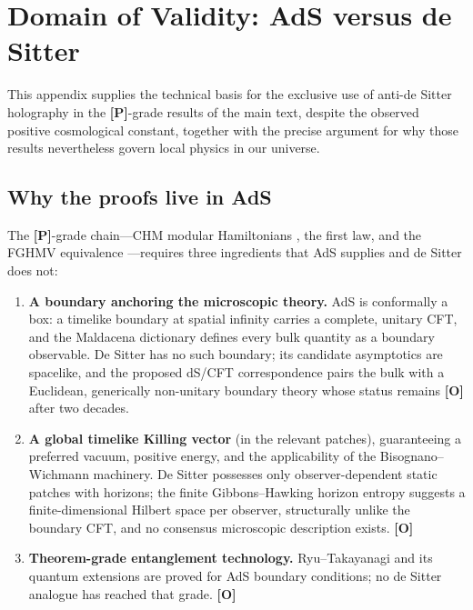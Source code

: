 \documentclass[11pt]{article}
\theoremstyle{definition}
\newcommand{\pP}{\textbf{[P]}}
\newcommand{\pO}{\textbf{[O]}}
\begin{document}
\appendix

\section{Domain of Validity: AdS versus de Sitter}
\label{app:adsds}

This appendix supplies the technical basis for the exclusive use of
anti-de Sitter holography in the \pP{}-grade results of the main text,
despite the observed positive cosmological constant, together with the
precise argument for why those results nevertheless govern local physics
in our universe.

\subsection{Why the proofs live in AdS}

The \pP{}-grade chain---CHM modular Hamiltonians \cite{CHM2011}, the first
law, and the FGHMV equivalence \cite{Faulkner2014,Lashkari2014}---requires
three ingredients that AdS supplies and de Sitter does not:

\begin{enumerate}[itemsep=2pt]
\item \textbf{A boundary anchoring the microscopic theory.} AdS is
conformally a box: a timelike boundary at spatial infinity carries a
complete, unitary CFT, and the Maldacena dictionary \cite{Maldacena1998}
defines every bulk quantity as a boundary observable. De Sitter has no
such boundary; its candidate asymptotics are spacelike, and the proposed
dS/CFT correspondence \cite{Strominger2001} pairs the bulk with a
Euclidean, generically non-unitary boundary theory whose status remains
\pO{} after two decades.
\item \textbf{A global timelike Killing vector} (in the relevant patches),
guaranteeing a preferred vacuum, positive energy, and the applicability of
the Bisognano--Wichmann machinery. De Sitter possesses only
observer-dependent static patches with horizons; the finite
Gibbons--Hawking horizon entropy \cite{GibbonsHawking1977} suggests a
finite-dimensional Hilbert space per observer, structurally unlike the
boundary CFT, and no consensus microscopic description exists. \pO{}
\item \textbf{Theorem-grade entanglement technology.} Ryu--Takayanagi and
its quantum extensions
\cite{RyuTakayanagi2006,FLM2013,EngelhardtWall2015} are proved for AdS
boundary conditions; no de Sitter analogue has reached that grade. \pO{}
\end{enumerate}
\end{document}
